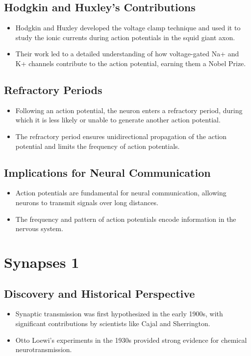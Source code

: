 \documentclass{article}
\begin{document}
\subsection{Hodgkin and Huxley's Contributions}
\begin{itemize}
    \item Hodgkin and Huxley developed the voltage clamp technique and used it to study the ionic currents during action potentials in the squid giant axon.
    \item Their work led to a detailed understanding of how voltage-gated Na+ and K+ channels contribute to the action potential, earning them a Nobel Prize.
\end{itemize}

\subsection{Refractory Periods}
\begin{itemize}
    \item Following an action potential, the neuron enters a refractory period, during which it is less likely or unable to generate another action potential.
    \item The refractory period ensures unidirectional propagation of the action potential and limits the frequency of action potentials.
\end{itemize}

\subsection{Implications for Neural Communication}
\begin{itemize}
    \item Action potentials are fundamental for neural communication, allowing neurons to transmit signals over long distances.
    \item The frequency and pattern of action potentials encode information in the nervous system.
\end{itemize}

\section{Synapses 1}

\subsection{Discovery and Historical Perspective}
\begin{itemize}
    \item Synaptic transmission was first hypothesized in the early 1900s, with significant contributions by scientists like Cajal and Sherrington.
    \item Otto Loewi's experiments in the 1930s provided strong evidence for chemical neurotransmission.
\end{itemize}
\end{document}
